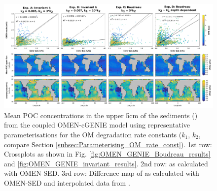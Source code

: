 \documentclass[gmd, manuscript]{copernicus}
\begin{document}
\begin{figure}[htbp]
\begin{center}
	\includegraphics[width=1.0\textwidth]{figures/OMEN-GENIE-Exp/0_1507_1707_COMPARE_INVARIANT_BOUDREAU_POC.pdf}
	\caption{Mean POC concentrations in the upper 5cm of the sediments () from the coupled OMEN-cGENIE model using representative parameterisations \citep[invariant and after][]{boudreau1997diagenetic} 
	for the OM degradation rate constants ($k_1$, $k_2$, compare Section \ref{subsec:Parameterising_OM_rate_const}). 
	1st row: Crossplots as shown in Fig. \ref{fig:OMEN_GENIE_Boudreau_results} and \ref{fig:OMEN_GENIE_invariant_results}. 
	2nd row:  as calculated with OMEN-SED. 
	3rd row: Difference map of  as calculated with OMEN-SED and interpolated data from \citet{seiter_organic_2004}.
	}\label{fig:OMEN_GENIE_invariant_and_Boudreau}
\end{center}
\end{figure}
\end{document}
